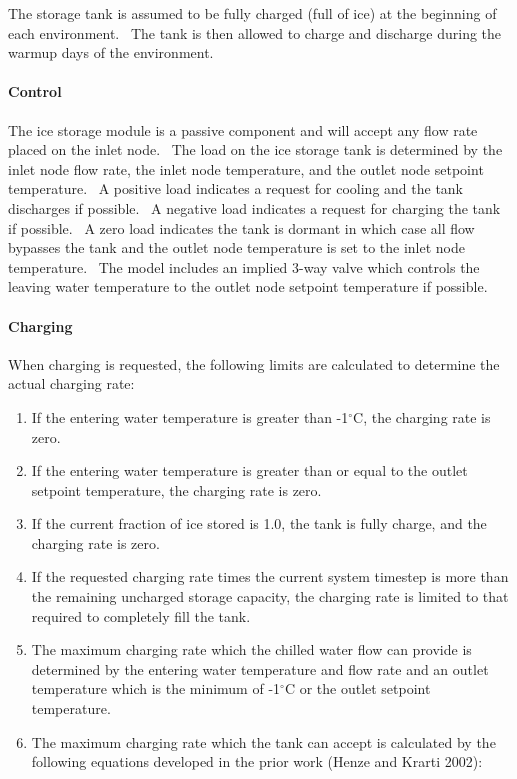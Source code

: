 The storage tank is assumed to be fully charged (full of ice) at the beginning of each environment.~ The tank is then allowed to charge and discharge during the warmup days of the environment.

\paragraph{Control}\label{control-000}

The ice storage module is a passive component and will accept any flow rate placed on the inlet node.~ The load on the ice storage tank is determined by the inlet node flow rate, the inlet node temperature, and the outlet node setpoint temperature.~ A positive load indicates a request for cooling and the tank discharges if possible.~ A negative load indicates a request for charging the tank if possible.~ A zero load indicates the tank is dormant in which case all flow bypasses the tank and the outlet node temperature is set to the inlet node temperature.~ The model includes an implied 3-way valve which controls the leaving water temperature to the outlet node setpoint temperature if possible.

\paragraph{Charging}\label{charging}

When charging is requested, the following limits are calculated to determine the actual charging rate:

\begin{enumerate}
\item If the entering water temperature is greater than -1\(^{\circ}\)C, the charging rate is zero.
\item If the entering water temperature is greater than or equal to the outlet setpoint temperature, the charging rate is zero.
\item If the current fraction of ice stored is 1.0, the tank is fully charge, and the charging rate is zero.
\item If the requested charging rate times the current system timestep is more than the remaining uncharged storage capacity, the charging rate is limited to that required to completely fill the tank.
\item The maximum charging rate which the chilled water flow can provide is determined by the entering water temperature and flow rate and an outlet temperature which is the minimum of -1\(^{\circ}\)C or the outlet setpoint temperature.
\item The maximum charging rate which the tank can accept is calculated by the following equations developed in the prior work (Henze and Krarti 2002):
\end{enumerate}

